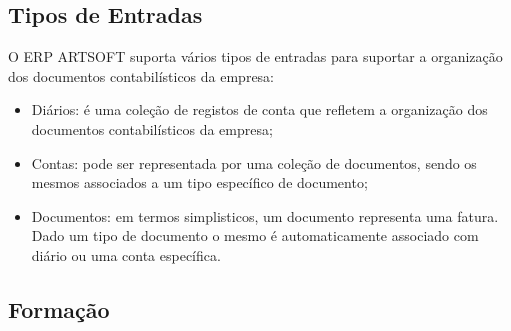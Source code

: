 \documentclass[sigplan]{acmart}
\begin{document}
\subsection{Tipos de Entradas}

O ERP ARTSOFT suporta vários tipos de entradas para suportar a organização dos documentos contabilísticos da empresa:

\begin{itemize}
  \item Diários: é uma coleção de registos de conta que refletem a organização dos documentos contabilísticos da empresa;
  \item Contas: pode ser representada por uma coleção de documentos, sendo os mesmos associados a um tipo específico de documento;
  \item Documentos: em termos simplisticos, um documento representa uma fatura. Dado um tipo de documento o mesmo é automaticamente associado com diário ou uma conta específica.
\end{itemize}

\subsection{Formação}
\end{document}
